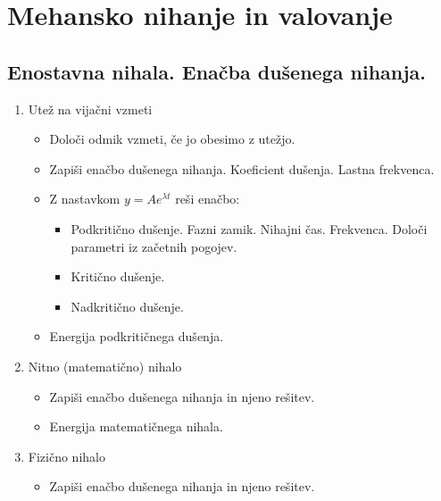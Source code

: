 \section{Mehansko nihanje in valovanje}
\subsection{Enostavna nihala. Enačba dušenega nihanja.}

\begin{enumerate}
    \item Utež na vijačni vzmeti
    
    \begin{itemize}
        \item Določi odmik vzmeti, če jo obesimo z utežjo.
        \item Zapiši enačbo dušenega nihanja. Koeficient dušenja. Lastna frekvenca.
        \item Z nastavkom \(y = Ae^{\lambda t}\) reši enačbo:
        \begin{itemize}
            \item Podkritično dušenje. Fazni zamik. Nihajni čas. Frekvenca.  Določi parametri iz začetnih pogojev.
            \item Kritično dušenje. 
            \item Nadkritično dušenje.
        \end{itemize}
        \item Energija podkritičnega dušenja.
    \end{itemize}

    \item Nitno (matematično) nihalo
    \begin{itemize}
        \item Zapiši enačbo dušenega nihanja in njeno rešitev.
        \item Energija matematičnega nihala.
    \end{itemize}

    \item Fizično nihalo
    \begin{itemize}
        \item Zapiši enačbo dušenega nihanja in njeno rešitev.
    \end{itemize}
\end{enumerate}